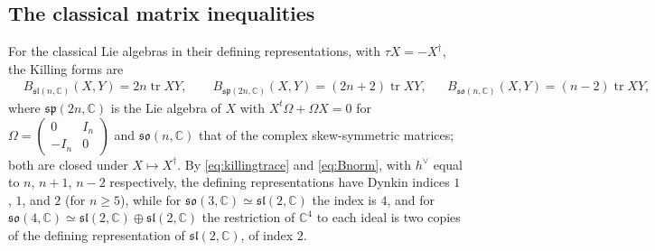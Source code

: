 \documentclass[leqno,10pt]{amsart}
\theoremstyle{definition}
\numberwithin{equation}{section}
\newcommand{\so}{\mathfrak{so}}
\renewcommand{\sp}{\mathfrak{sp}}
\newcommand{\sll}{\mathfrak{sl}}
\newcommand{\com}{\mathbb C}
\newcommand{\tr}{\operatorname{tr}}
\newcommand{\hv}{h^\vee}
\begin{document}
\subsection{The classical matrix inequalities}\label{sec:classical}
For the classical Lie algebras in their defining representations, with $\tau X = -X^{\dagger}$, the Killing forms are
\begin{align}\label{eq:killingtrace}
&B_{\sll(n, \com)}(X, Y) = 2n\tr XY, \qquad B_{\sp(2n, \com)}(X, Y) = (2n+2)\tr XY,&
&B_{\so(n, \com)}(X, Y) = (n-2)\tr XY,
\end{align}
where $\sp(2n, \com)$ is the Lie algebra of $X$ with $X^{t}\Omega + \Omega X = 0$ for $\Omega = \left(\begin{smallmatrix}0 & I_{n}\\ -I_{n} & 0\end{smallmatrix}\right)$ and $\so(n, \com)$ that of the complex skew-symmetric matrices; both are closed under $X \mapsto X^{\dagger}$. By \eqref{eq:killingtrace} and \eqref{eq:Bnorm}, with $\hv$ equal to $n$, $n+1$, $n-2$ respectively, the defining representations have Dynkin indices $1$, $1$, and $2$ (for $n \geq 5$), while for $\so(3, \com) \simeq \sll(2, \com)$ the index is $4$, and for $\so(4, \com) \simeq \sll(2, \com) \oplus \sll(2, \com)$ the restriction of $\com^{4}$ to each ideal is two copies of the defining representation of $\sll(2, \com)$, of index $2$.
\end{document}
